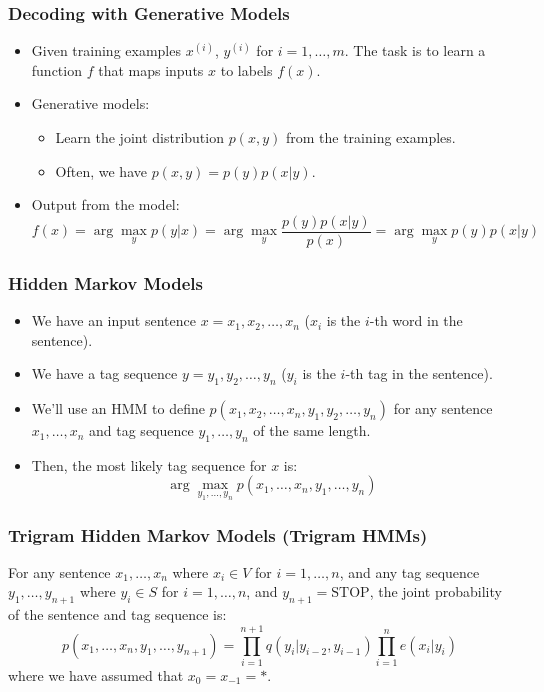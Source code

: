 \documentclass[handout]{beamer}
\begin{document}
\begin{frame}
  \frametitle{Decoding with Generative Models}
  \begin{itemize}
    \item Given training examples $x^{(i)}$, $y^{(i)}$ for $i = 1, \ldots, m$. The task is to learn a function $f$ that maps inputs $x$ to labels $f(x)$.
    \item Generative models:
    \begin{itemize}
      \item Learn the joint distribution $p(x, y)$ from the training examples.
      \item Often, we have $p(x, y) = p(y)p(x|y)$.
    \end{itemize}
    \item Output from the model:
    \[
      f(x) = \arg\max_y p(y|x) = \arg\max_y \frac{p(y)p(x|y)}{p(x)} = \arg\max_y p(y)p(x|y)
    \]
  \end{itemize}
\end{frame}

\begin{frame}
  \frametitle{Hidden Markov Models}
  \begin{itemize}
    \item We have an input sentence $x = x_1, x_2, \ldots, x_n$ ($x_i$ is the $i$-th word in the sentence).
    \item We have a tag sequence $y = y_1, y_2, \ldots, y_n$ ($y_i$ is the $i$-th tag in the sentence).
    \item We'll use an HMM to define $p(x_1, x_2, \ldots, x_n, y_1, y_2, \ldots, y_n)$ for any sentence $x_1, \ldots, x_n$ and tag sequence $y_1, \ldots, y_n$ of the same length.
    \item Then, the most likely tag sequence for $x$ is:
    \[
      \arg\max_{y_1,\ldots,y_n} p(x_1, \ldots, x_n, y_1, \ldots, y_n)
    \]
  \end{itemize}
\end{frame}

\begin{frame}
  \frametitle{Trigram Hidden Markov Models (Trigram HMMs)}
  For any sentence $x_1, \ldots, x_n$ where $x_i \in V$ for $i = 1, \ldots, n$, and any tag sequence $y_1, \ldots, y_{n+1}$ where $y_i \in S$ for $i = 1, \ldots, n$, and $y_{n+1} = \text{STOP}$, the joint probability of the sentence and tag sequence is:
  \[
    p(x_1, \ldots, x_n, y_1, \ldots, y_{n+1}) = \prod_{i=1}^{n+1} q(y_i | y_{i-2}, y_{i-1}) \prod_{i=1}^{n} e(x_i | y_i)
  \]
  where we have assumed that $x_0 = x_{-1} = *$.
\end{frame}
\end{document}
